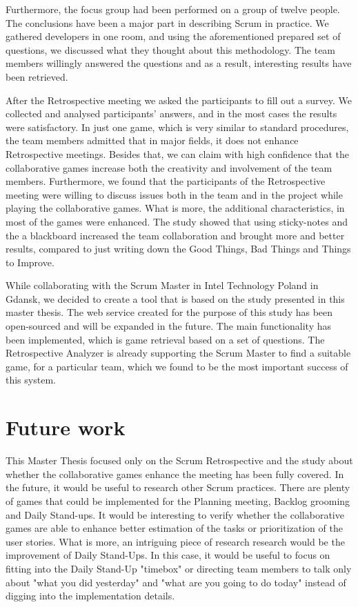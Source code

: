 Furthermore, the focus group had been performed on a group of twelve people. The conclusions have been a major part in describing Scrum in practice. We gathered developers in one room, and using the aforementioned prepared set of questions, we discussed what they thought about this methodology. The team members willingly answered the questions and as a result, interesting results have been retrieved.

After the Retrospective meeting we asked the participants to fill out a survey. We collected and analysed participants' answers, and in the most cases the results were satisfactory. In just one game, which is very similar to standard procedures, the team members admitted that in major fields, it does not enhance Retrospective meetings. Besides that, we can claim with high confidence that the collaborative games increase both the creativity and involvement of the team members. Furthermore, we found that the participants of the Retrospective meeting were willing to discuss issues both in the team and in the project while playing the collaborative games. What is more, the additional characteristics, in most of the games were enhanced. The study showed that using sticky-notes and the a blackboard increased the team collaboration and brought more and better results, compared to just writing down the Good Things, Bad Things and Things to Improve.

While collaborating with the Scrum Master in Intel Technology Poland in Gdansk, we decided to create a tool that is based on the study presented in this master thesis. The web service created for the purpose of this study has been open-sourced and will be expanded in the future. The main functionality has been implemented, which is game retrieval based on a set of questions. The Retrospective Analyzer is already supporting the Scrum Master to find a suitable game, for a particular team, which we found to be the most important success of this system.

\section{Future work}

This Master Thesis focused only on the Scrum Retrospective and the study about whether the collaborative games enhance the meeting has been fully covered. In the future, it would be useful to research other Scrum practices. There are plenty of games that could be implemented for the Planning meeting, Backlog grooming and Daily Stand-ups. It would be interesting to verify whether the collaborative games are able to enhance better estimation of the tasks or prioritization of the user stories. What is more, an intriguing piece of research research would be the improvement of Daily Stand-Ups. In this case, it would be useful to focus on fitting into the Daily Stand-Up "timebox" or directing team members to talk only about "what you did yesterday" and "what are you going to do today" instead of digging into the implementation details.

